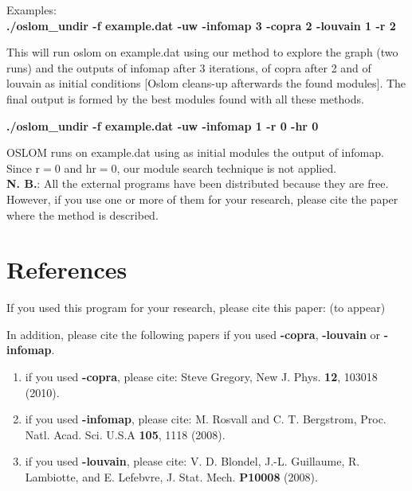 \documentclass[11pt]{article}
\begin{document}
   
   
  
  
  Examples:
  \\
  
{ \textbf{./oslom\_undir  -f example.dat -uw -infomap 3 -copra 2 -louvain 1 -r 2 } }
  
This will run oslom on example.dat using our method to explore the graph (two runs) and the outputs of infomap after 3 iterations, of copra after 2 and of louvain as initial conditions  [Oslom cleans-up afterwards the found modules]. The final output is formed by the best modules found with all these methods.   

  { \textbf{./oslom\_undir -f example.dat -uw -infomap 1 -r 0 -hr 0} }
  
OSLOM runs on example.dat using as initial modules the output of infomap. Since $\textrm{r} = 0$ and $\textrm{hr}=0$, our module search technique is not applied.
\\
  
  



  
  
   
    \textbf{N. B.}: All the external programs have been distributed
because they are free. However, 
if you use one or more of them for your research, please cite the
paper where the method is described.

    
  
  


\section{References}


If you used this program for your research, please cite this paper: (to appear)

\vskip0.3cm

\noindent In addition, please cite the following papers if you used  \textbf{-copra}, \textbf{-louvain} or \textbf{-infomap}.

\begin{enumerate}

  \item if you used \textbf{-copra}, please cite: Steve Gregory,
    New J. Phys. {\bf 12}, 103018 (2010).
  \item if you used \textbf{-infomap}, please cite: M. Rosvall and
    C. T. Bergstrom, Proc. Natl. Acad. Sci. U.S.A {\bf 105}, 1118 (2008).
\item if you used \textbf{-louvain}, please cite:   V. D. Blondel,
  J.-L. Guillaume, R. Lambiotte, and E. Lefebvre, J. Stat. Mech. {\bf
    P10008} (2008).
\end{enumerate}
\end{document}
